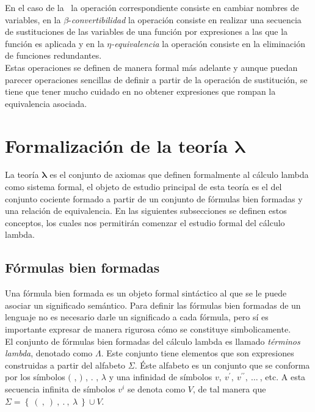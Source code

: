 En el caso de la \alphacong~la operación correspondiente consiste en cambiar
nombres de variables, en la \(\beta\)-\emph{convertibilidad} la operación
consiste en realizar una secuencia de sustituciones de las variables de una
función por expresiones a las que la función es aplicada y en la
\(\eta\)\emph{-equivalencia} la operación consiste en la eliminación de funciones
redundantes.\\

Estas operaciones se definen de manera formal más adelante y aunque puedan
parecer operaciones sencillas de definir a partir de la operación de
sustitución, se tiene que tener mucho cuidado en no obtener expresiones que
rompan la equivalencia asociada.\\

\section{Formalización de la teoría
  \texorpdfstring{$\boldsymbol\lambda$}{lambda}} \label{sec:1.2}

La teoría \(\boldsymbol\lambda\) es el conjunto de axiomas que definen
formalmente al cálculo lambda como sistema formal, el objeto de estudio
principal de esta teoría es el del conjunto cociente formado a partir de un
conjunto de fórmulas bien formadas y una relación de equivalencia. En las
siguientes subsecciones se definen estos conceptos, los cuales nos permitirán
comenzar el estudio formal del cálculo lambda.\\

\subsection{Fórmulas bien formadas} \label{sec:1.2.1}

Una fórmula bien formada es un objeto formal sintáctico al que se le puede
asociar un significado semántico. Para definir las fórmulas bien formadas de un
lenguaje no es necesario darle un significado a cada fórmula, pero sí es
importante expresar de manera rigurosa cómo se constituye simbolicamente.\\

El conjunto de fórmulas bien formadas del cálculo lambda es llamado
\emph{términos lambda}, denotado como \(\Lambda\). Este conjunto tiene elementos
que son expresiones construidas a partir del alfabeto \(\Sigma\). Éste alfabeto es
un conjunto que se conforma por los símbolos \((\) , \()\) , \(.\) , \(\lambda\)
y una infinidad de símbolos \(v ,\ v^{\prime} ,\ v^{\prime\prime} ,\ \dots\ \),
etc. A esta secuencia infinita de símbolos \(v^i\) se denota como \(V\), de
tal manera que \(\Sigma = \left\{\  (\ ,\ )\ ,\ .\ ,\ \lambda\ \right\} \cup V\).\\

